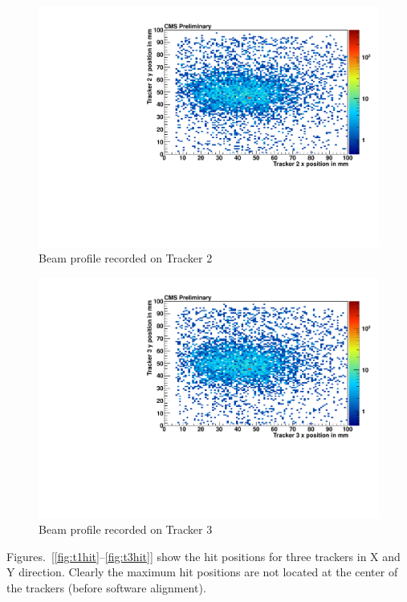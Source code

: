 \begin{figure}[!htbp]
\centering
\includegraphics[width=5.1in]{figures/GEM/profile_plots_for_Tracker2_Run1897.pdf}
\caption{Beam profile recorded on Tracker 2}\label{fig:t2bp}
\end{figure}

\begin{figure}[!htbp]
\centering
\includegraphics[width=5.1in]{figures/GEM/profile_plots_for_Tracker3_Run1897.pdf}
\caption{Beam profile recorded on Tracker 3}\label{fig:t3bp}
\end{figure}



Figures.~[\ref{fig:t1hit}--\ref{fig:t3hit}] show the hit positions for three trackers in X and Y direction. Clearly the maximum hit positions are not located at the center of the trackers (before software alignment).

